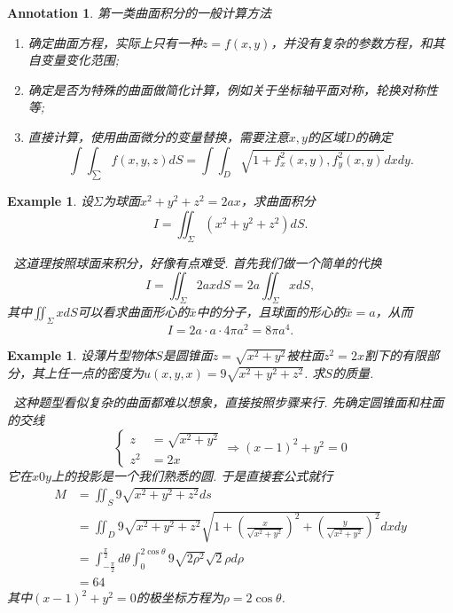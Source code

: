 \documentclass{article}
\newtheorem{example}[theorem]{Example}
\newtheorem{annotation}[theorem]{Annotation}
\newcommand{\hints}{{\color{blue} \text{hints}}}
\begin{document}
\begin{annotation}
\rm 第一类曲面积分的一般计算方法
\begin{enumerate}
	\item 确定曲面方程，实际上只有一种$z=f(x,y)$，并没有复杂的参数方程，和其自变量变化范围; 
	\item 确定是否为特殊的曲面做简化计算，例如关于坐标轴平面对称，轮换对称性等;
	\item 直接计算，使用曲面微分的变量替换，需要注意$x,y$的区域$D$的确定
	$$
\int\int_\sum f(x,y,z)dS = \int\int_D\sqrt{1+f_x^2(x,y),f_y^2(x,y)}dxdy.
$$
\end{enumerate}
\end{annotation}

\begin{example}
\rm 设$\Sigma$为球面$x^2 + y^2 + z^2 = 2ax$，求曲面积分
$$
I =\iint_{\Sigma} (x^2 + y^2 + z^2)dS.
$$

\hints\ 这道理按照球面来积分，好像有点难受. 首先我们做一个简单的代换
$$
I = \iint_{\Sigma} 2ax dS = 2a \iint_{\Sigma} xdS,
$$
其中$\iint_{\Sigma} xdS$可以看求曲面形心的$\bar{x}$中的分子，且球面的形心的$\bar{x} = a$，从而
$$
I = 2a \cdot a \cdot 4\pi a^2 = 8\pi a^4. 
$$
\end{example}

\begin{example}
\rm 设薄片型物体$S$是圆锥面$z=\sqrt{x^2+y^2}$被柱面$z^2 = 2x$割下的有限部分，其上任一点的密度为$u(x,y,x)=9\sqrt{x^2 + y^2 + z^2}$. 求$S$的质量. 

\hints\ 这种题型看似复杂的曲面都难以想象，直接按照步骤来行. 先确定圆锥面和柱面的交线
$$
\left\{
\begin{aligned}
z&=\sqrt{x^2+y^2} \\
z^2 &= 2x
\end{aligned} \right.  \Rightarrow 
(x-1)^2 + y^2 = 0
$$
它在$x0y$上的投影是一个我们熟悉的圆. 于是直接套公式就行
$$
\begin{aligned}
M &= \iint_S 9\sqrt{x^2 + y^2 + z^2}ds \\
 &=  \iint_D 9\sqrt{x^2 + y^2 + z^2}\sqrt{1 + \left(\frac{x}{\sqrt{x^2 + y^2}}\right)^2 + \left(\frac{y}{\sqrt{x^2 + y^2}}\right)^2}dxdy \\
 &= \int_{-\frac{\pi}{2}}^{\frac{\pi}{2}}d\theta \int_0^{2\cos\theta} 9\sqrt{2\rho^2}\sqrt{2} \rho d\rho \\
 &= 64
\end{aligned}
$$
其中$(x-1)^2 + y^2=0$的极坐标方程为$\rho = 2\cos\theta$. 
\end{example}
\end{document}
